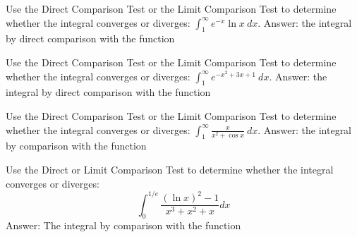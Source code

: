 \documentclass{ximera}
\begin{document}
\begin{exercise}
Use the Direct Comparison Test or the Limit Comparison Test to determine whether the integral converges or diverges:
 \(\displaystyle \int_{1}^\infty e^{-x} \ln x \ dx.\)
 Answer: the integral 
  by direct comparison with the function 
 \begin{multipleChoice}
 \end{multipleChoice}
\end{exercise}

\begin{exercise}
Use the Direct Comparison Test or the Limit Comparison Test to determine whether the integral converges or diverges:
 \(\displaystyle \int_{1}^\infty e^{-x^2 + 3x + 1} \ dx.\)
 Answer: the integral 
  by direct comparison with the function 
 \begin{multipleChoice}
 \end{multipleChoice}
\end{exercise}

\begin{exercise}
Use the Direct Comparison Test or the Limit Comparison Test to determine whether the integral converges or diverges:
 \(\displaystyle \int_{1}^\infty \frac{x}{x^2+\cos x} \ dx.\)
 Answer: the integral 
  by  comparison with the function 
 \begin{multipleChoice}
 \end{multipleChoice}
\end{exercise}


\begin{exercise}
Use the Direct or Limit Comparison Test to determine whether the integral converges or diverges:
\[ \int_0^{1/e} \frac{(\ln x)^2-1}{x^3 + x^2 + x} dx \]
Answer: The integral  by  comparison with the function 
\begin{multipleChoice}
\end{multipleChoice}
\end{exercise}
\end{document}
